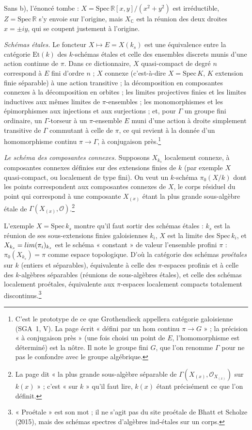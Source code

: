 \documentclass[11pt,a4paper]{article}
\begin{document}
Sans b), l'énoncé tombe : $X = \mathrm{Spec}\, \mathbb{R}[x,y]/(x^{2} + y^{2})$
est irréductible, $Z = \mathrm{Spec}\, \mathbb{R}$ s'y envoie sur l'origine,
mais $X_{\mathbb{C}}$ est la réunion des deux droites $x = \pm i y$, qui se
coupent justement à l'origine.

\emph{Schémas étales.} Le foncteur $X \mapsto E = X(k_{s})$ est une
équivalence entre la catégorie $\mathrm{Et}(k)$ des $k$-schémas étales et
celle des ensembles discrets munis d'une action continue de $\pi$. Dans ce
dictionnaire, $X$ quasi-compact de degré $n$ correspond à $E$ fini d'ordre
$n$ ; $X$ connexe (c'est-à-dire $X = \mathrm{Spec}\, K$, $K$ extension finie
séparable) à une action transitive ; la décomposition en composantes
connexes à la décomposition en orbites ; les limites projectives finies et
les limites inductives aux mêmes limites de $\pi$-ensembles ; les
monomorphismes et les épimorphismes aux injections et aux surjections ; et,
pour $\Gamma$ un groupe fini ordinaire, un $\Gamma$-torseur à un
$\pi$-ensemble $E$ muni d'une action à droite simplement transitive de
$\Gamma$ commutant à celle de $\pi$, ce qui revient à la donnée d'un
homomorphisme continu $\pi \to \Gamma$, à conjugaison près.\footnote{C'est
le prototype de ce que Grothendieck appellera catégorie galoisienne
(SGA~1, V). La page écrit « défini par un hom continu $\pi \to G$ » ; la
précision « à conjugaison près » (une fois choisi un point de $E$,
l'homomorphisme est déterminé) est la nôtre. Il note le groupe fini $G$, que
l'on renomme $\Gamma$ pour ne pas le confondre avec le groupe algébrique.}

\emph{Le schéma des composantes connexes.} Supposons $X_{k_{s}}$ localement
connexe, à composantes connexes définies sur des extensions finies de $k$
(par exemple $X$ quasi-compact, ou localement de type fini). On veut un
$k$-schéma $\pi_{0}(X/k)$ dont les points correspondent aux composantes
connexes de $X$, le corps résiduel du point qui correspond à une composante
$X_{(x)}$ étant la plus grande sous-algèbre étale de
$\Gamma(X_{(x)}, \mathcal{O})$.\footnote{La page dit « la plus grande
sous-algèbre séparable de $\Gamma(X_{(x)}, \mathcal{O}_{X_{(x)}})$
sur $k(x)$ » ; c'est « sur $k$ » qu'il faut lire, $k(x)$ étant
précisément ce que l'on définit.}

L'exemple $X = \mathrm{Spec}\, k_{s}$ montre qu'il faut sortir des schémas
étales : $k_{s}$ est la réunion de ses sous-extensions finies galoisiennes
$k_{i}$, $X$ est la limite des $\mathrm{Spec}\, k_{i}$, et
$X_{k_{s}} = \varprojlim (\pi_{i})_{k_{s}}$ est le schéma « constant » de
valeur l'ensemble profini $\pi$ : $\pi_{0}(X_{k_{s}}) = \pi$ comme espace
topologique. D'où la catégorie des schémas \emph{proétales} sur $k$ (entiers
et séparables), équivalente à celle des $\pi$-espaces profinis et à celle des
$k$-algèbres séparables (réunions de sous-algèbres étales), et celle des
schémas localement proétales, équivalente aux $\pi$-espaces localement
compacts totalement discontinus.\footnote{« Proétale » est son mot ; il ne
s'agit pas du site proétale de Bhatt et Scholze (2015), mais des schémas
spectres d'algèbres ind-étales sur un corps.}
\end{document}
